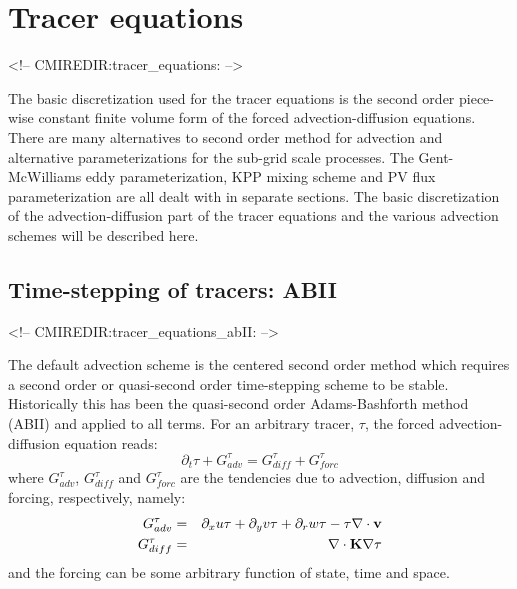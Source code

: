 
\section{Tracer equations}
\label{sect:tracer_equations}
\begin{rawhtml}
<!-- CMIREDIR:tracer_equations: -->
\end{rawhtml}

The basic discretization used for the tracer equations is the second
order piece-wise constant finite volume form of the forced
advection-diffusion equations. There are many alternatives to second
order method for advection and alternative parameterizations for the
sub-grid scale processes. The Gent-McWilliams eddy parameterization,
KPP mixing scheme and PV flux parameterization are all dealt with in
separate sections. The basic discretization of the advection-diffusion
part of the tracer equations and the various advection schemes will be
described here.

\subsection{Time-stepping of tracers: ABII}
\label{sect:tracer_equations_abII}
\begin{rawhtml}
<!-- CMIREDIR:tracer_equations_abII: -->
\end{rawhtml}

The default advection scheme is the centered second order method which
requires a second order or quasi-second order time-stepping scheme to
be stable. Historically this has been the quasi-second order
Adams-Bashforth method (ABII) and applied to all terms. For an
arbitrary tracer, $\tau$, the forced advection-diffusion equation
reads:
\begin{equation}
\partial_t \tau + G_{adv}^\tau = G_{diff}^\tau + G_{forc}^\tau
\end{equation}
where $G_{adv}^\tau$, $G_{diff}^\tau$ and $G_{forc}^\tau$ are the
tendencies due to advection, diffusion and forcing, respectively,
namely:
\begin{eqnarray}
G_{adv}^\tau & = & \partial_x u \tau + \partial_y v \tau + \partial_r w \tau
- \tau \nabla \cdot {\bf v} \\
G_{diff}^\tau & = & \nabla \cdot {\bf K} \nabla \tau
\end{eqnarray}
and the forcing can be some arbitrary function of state, time and
space.

